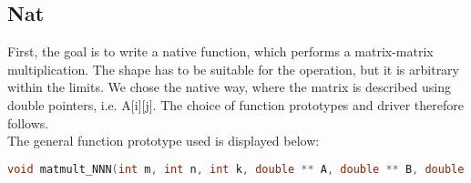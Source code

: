 \subsection{Nat}

First, the goal is to write a native function, which performs a matrix-matrix multiplication. The shape has to be suitable for the operation, but it is arbitrary within the limits. We chose the native way, where the matrix is described using double pointers, i.e. A[i][j]. The choice of function prototypes and driver therefore follows.  \\
The general function prototype used is displayed below:
\begin{lstlisting}[language=C++, caption=Function Prototype]
void matmult_NNN(int m, int n, int k, double ** A, double ** B, double ** C)
\end{lstlisting}

